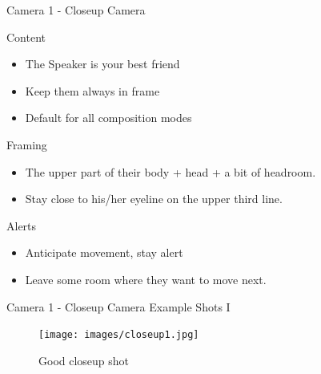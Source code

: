 \documentclass[aspectratio=169]{beamer}
\begin{document}


\begin{frame}{Camera 1 - Closeup Camera}
		\begin{block}{Content}
			\begin{itemize}
				\item The Speaker is your best friend
				\item Keep them always in frame
				\item Default for all composition modes
			\end{itemize}
		\end{block}
		
		\begin{block}{Framing}
			\begin{itemize}
				\item The upper part of their body + head + a bit of headroom.
				\item Stay close to his/her eyeline on the upper third line.
			\end{itemize}
		\end{block}

		\begin{alertblock}{Alerts}
			\begin{itemize}
				\item Anticipate movement, stay alert
				\item Leave some room where they want to move next.
			\end{itemize}
		\end{alertblock}
\end{frame}

\begin{frame}{Camera 1 - Closeup Camera}
	Example Shots I
	\begin{figure} 
		\centering
		\texttt{[image: images/closeup1.jpg]}
		\caption{Good closeup shot}
	\end{figure}
\end{frame}
\end{document}
